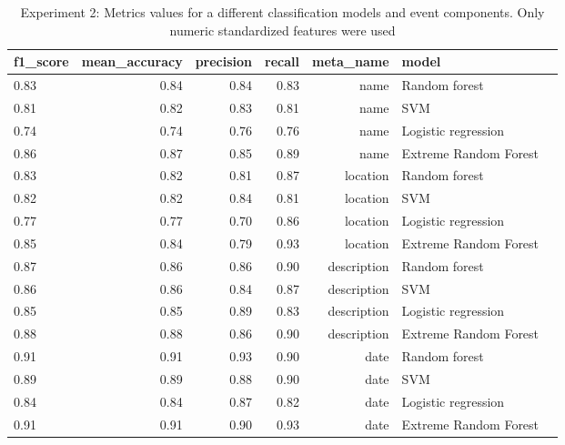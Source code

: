 \begin{table}[h]
\begin{center}
{\renewcommand{\arraystretch}{1.2}
\begin{tabular}{lrrrrll}
\toprule
f1\_score &  mean\_accuracy &  precision &  recall &    meta\_name &                  model \\
\midrule
0.83 &           0.84 &       0.84 &    0.83 &         name &          Random forest \\
0.81 &           0.82 &       0.83 &    0.81 &         name &                    SVM \\
0.74 &           0.74 &       0.76 &    0.76 &         name &    Logistic regression \\
0.86 &           0.87 &       0.85 &    0.89 &         name &  Extreme Random Forest \\
\midrule
0.83 &           0.82 &       0.81 &    0.87 &     location &          Random forest \\
0.82 &           0.82 &       0.84 &    0.81 &     location &                    SVM \\
0.77 &           0.77 &       0.70 &    0.86 &     location &    Logistic regression \\
0.85 &           0.84 &       0.79 &    0.93 &     location &  Extreme Random Forest \\
\midrule
0.87 &           0.86 &       0.86 &    0.90 &  description &          Random forest \\
0.86 &           0.86 &       0.84 &    0.87 &  description &                    SVM \\
0.85 &           0.85 &       0.89 &    0.83 &  description &    Logistic regression \\
0.88 &           0.88 &       0.86 &    0.90 &  description &  Extreme Random Forest \\
\midrule
0.91 &           0.91 &       0.93 &    0.90 &         date &          Random forest \\
0.89 &           0.89 &       0.88 &    0.90 &         date &                    SVM \\
0.84 &           0.84 &       0.87 &    0.82 &         date &    Logistic regression \\
0.91 &           0.91 &       0.90 &    0.93 &         date &  Extreme Random Forest \\
\bottomrule
\end{tabular}}
\caption{Experiment 2: Metrics values for a different classification models and event components. Only numeric standardized features were used}
\label{table:sumresult}
\end{center}
\end{table} 